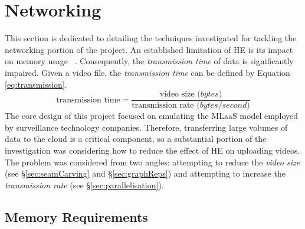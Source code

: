 \setlength{\leftskip}{0cm}



\section{Networking}
\label{sec:networking}
\setlength{\leftskip}{0.25cm}
\indent \indent
This section is dedicated to detailing the techniques investigated for tackling the networking portion of the project. An established limitation of HE is its impact on memory usage ~\cite{Makkaoui}. Consequently, the \textit{transmission time} of data is significantly impaired. Given a video file, the \textit{transmission time} can be defined by Equation \ref{eq:transmission}.
\begin{equation}
    \text{transmission time} = \frac{\text{video size }\textit{(bytes)}}{\text{transmission rate }\textit{(bytes/second)}}
    \label{eq:transmission}
\end{equation}
\indent \indent
The core design of this project focused on emulating the MLaaS model employed by surveillance technology companies. Therefore, transferring large volumes of data to the cloud is a critical component, so a substantial portion of the investigation was considering how to reduce the effect of HE on uploading videos. The problem was considered from two angles: attempting to reduce the \textit{video size} (see §\ref{sec:seamCarving} and §\ref{sec:graphReps}) and attempting to increase the \textit{transmission rate} (see §\ref{sec:parallelisation}).

\setlength{\leftskip}{0cm}
\subsection{Memory Requirements}
